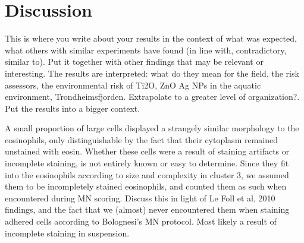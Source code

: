 \chapter{Discussion}
\label{chap:discuss}

This is where you write about your results in the context of what was expected, what others with similar experiments have found (in line with, contradictory, similar to). Put it together with other findings that may be relevant or interesting. The results are interpreted: what do they mean for the field, the risk assessors, the environmental risk of Ti2O, ZnO Ag NPs in the aquatic environment, Trondheimsfjorden. Extrapolate to a greater level of organization?. Put the results into a bigger context.

A small proportion of large cells displayed a strangely similar morphology to the eosinophils, only distinguishable by the fact that their cytoplasm remained unstained with eosin. Whether these cells were a result of staining artifacts or incomplete staining, is not entirely known or easy to determine. Since they fit into the eosinophils according to size and complexity in cluster 3, we assumed them to be incompletely stained eosinophils, and counted them as such when encountered during MN scoring. Discuss this in light of Le Foll et al, 2010 findings, and the fact that we (almost) never encountered them when staining adhered cells according to Bolognesi's MN protocol. Most likely a result of incomplete staining in suspension.